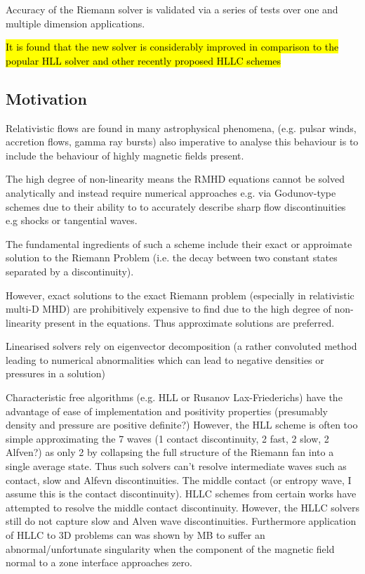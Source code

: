 \documentclass{article}
\begin{document}
Accuracy of the Riemann solver is validated via a series of tests over one and multiple dimension applications. 

\hl{It is found that the new solver is considerably improved in comparison to the popular HLL solver and other recently proposed HLLC schemes}

\subsection{Motivation}

Relativistic flows are found in many astrophysical phenomena, (e.g. pulsar winds, accretion flows, gamma ray bursts) also imperative to analyse this behaviour is to include the behaviour of highly magnetic fields present. 

The high degree of non-linearity means the RMHD equations cannot be solved analytically and instead require numerical approaches e.g. via Godunov-type schemes due to their ability to to accurately describe sharp flow discontinuities e.g shocks or tangential waves. 

The fundamental ingredients of such a scheme include their exact or approimate solution to the Riemann Problem (i.e. the decay between two constant states separated by a discontinuity).

However, exact solutions to the exact Riemann problem (especially in relativistic multi-D MHD) are prohibitively expensive to find due to the high degree of non-linearity present in the equations. Thus approximate solutions are preferred. 

Linearised solvers rely on eigenvector decomposition (a rather convoluted method leading to numerical abnormalities which can lead to negative densities or pressures in a solution)

Characteristic free algorithms (e.g. HLL or Rusanov Lax-Friederichs) have the advantage of ease of implementation and positivity properties (presumably density and pressure are positive definite?) However, the HLL scheme is often too simple approximating the 7 waves (1 contact discontinuity, 2 fast, 2 slow, 2 Alfven?) as only 2 by collapsing the full structure of the Riemann fan into a single average state. Thus such solvers can't resolve intermediate waves such as contact, slow and Alfevn discontinuities. The middle contact (or entropy wave, I assume this is the contact discontinuity). HLLC schemes from certain works have attempted to resolve the middle contact discontinuity. However, the HLLC solvers still do not capture slow and Alven wave discontinuities. Furthermore application of HLLC to 3D problems can was shown by MB to suffer an abnormal/unfortunate singularity when the component of the magnetic field normal to a zone interface approaches zero. 
\end{document}
